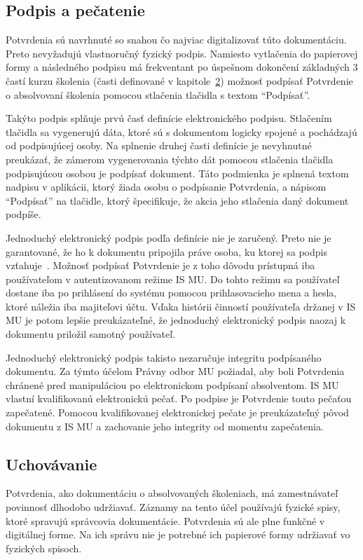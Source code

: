 \documentclass[
  digital,     %
  oneside,     %
  nosansbold,  %
  nocolorbold, %
  lof,         %
  nolot,         %
]{fithesis4}
\begin{document}
\subsection*{Podpis a pečatenie}
Potvrdenia sú navrhnuté so snahou čo najviac digitalizovať túto dokumentáciu. Preto nevyžadujú vlastnoručný fyzický podpis. Namiesto vytlačenia do papierovej formy a následného podpisu má frekventant po úspešnom dokončení základných 3 častí kurzu školenia (časti definované v kapitole~\hyperref[kap-2]{2}) možnosť podpísať Potvrdenie o absolvovaní školenia pomocou stlačenia tlačidla s textom \enquote{Podpísať}. 

Takýto podpis splňuje prvú časť definície elektronického podpisu. Stlačením tlačidla sa vygenerujú dáta, ktoré sú s dokumentom logicky spojené a pochádzajú od podpisujúcej osoby. Na splnenie druhej časti definície je nevyhnutné preukázať, že zámerom vygenerovania týchto dát pomocou stlačenia tlačidla podpisujúcou osobou je podpísať dokument. Táto podmienka je splnená textom nadpisu v aplikácii, ktorý žiada osobu o podpísanie Potvrdenia, a nápisom \enquote{Podpísať} na tlačidle, ktorý špecifikuje, že akcia jeho stlačenia daný dokument podpíše.

Jednoduchý elektronický podpis podľa definície nie je zaručený. Preto nie je garantované, že ho k dokumentu pripojila práve osoba, ku ktorej sa podpis vzťahuje~\cite{navara2021}. Možnosť podpísať Potvrdenie je z toho dôvodu prístupná iba používateľom v autentizovanom režime IS MU. Do tohto režimu sa používateľ dostane iba po prihlásení do systému pomocou prihlasovacieho mena a hesla, ktoré náležia iba majiteľovi účtu. Vďaka histórii činností používateľa držanej v IS MU je potom lepšie preukázateľné, že jednoduchý elektronický podpis naozaj k dokumentu priložil samotný používateľ.

Jednoduchý elektronický podpis takisto nezaručuje integritu podpísaného dokumentu. Za týmto účelom Právny odbor MU požiadal, aby boli Potvrdenia chránené pred manipuláciou po elektronickom podpísaní absolventom. IS MU vlastní kvalifikovanú elektronickú pečať. Po podpise je Potvrdenie touto pečaťou zapečatené. Pomocou kvalifikovanej elektronickej pečate je preukázateľný pôvod dokumentu z IS MU a zachovanie jeho integrity od momentu zapečatenia.

\subsection*{Uchovávanie}
Potvrdenia, ako dokumentáciu o absolvovaných školeniach, má zamestnávateľ povinnosť dlhodobo udržiavať. Záznamy na tento účel používajú fyzické spisy, ktoré spravujú správcovia dokumentácie. Potvrdenia sú ale plne funkčné v digitálnej forme. Na ich správu nie je potrebné ich papierové formy udržiavať vo fyzických spisoch.
\end{document}
